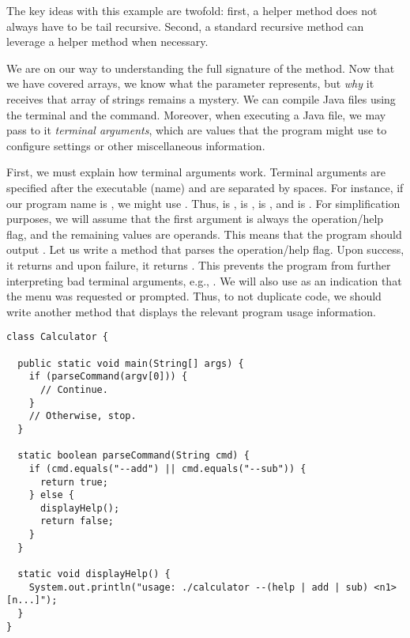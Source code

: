The key ideas with this example are twofold: first, a helper method does not always have to be tail recursive. Second, a standard recursive method can leverage a helper method when necessary.

We are on our way to understanding the full signature of the  method. Now that we have covered arrays, we know what the  parameter represents, but \emph{why} it receives that array of strings remains a mystery. We can compile Java files using the terminal and the  command. Moreover, when executing a Java file, we may pass to it \emph{terminal arguments}, which are values that the program might use to configure settings or other miscellaneous information.


First, we must explain how terminal arguments work. Terminal arguments are specified after the executable (name) and are separated by spaces. For instance, if our program name is , we might use . Thus,  is ,  is ,  is , and  is . For simplification purposes, we will assume that the first argument is always the operation/help flag, and the remaining values are operands. This means that the program should output . Let us write a method that parses the operation/help flag. Upon success, it returns  and upon failure, it returns . This prevents the program from further interpreting bad terminal arguments, e.g., . We will also use  as an indication that the  menu was requested or prompted. Thus, to not duplicate code, we should write another method that displays the relevant program usage information.

\begin{lstlisting}[language=MyJava]
class Calculator {

  public static void main(String[] args) {
    if (parseCommand(argv[0])) {
      // Continue.
    }
    // Otherwise, stop.
  }

  static boolean parseCommand(String cmd) {
    if (cmd.equals("--add") || cmd.equals("--sub")) {
      return true;
    } else {
      displayHelp();
      return false;
    }
  }

  static void displayHelp() {
    System.out.println("usage: ./calculator --(help | add | sub) <n1> [n...]");
  }
}
\end{lstlisting}

